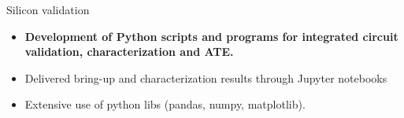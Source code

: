 \begin{cventries}
{\begin{cvitems}
\begin{itemize}
\begin{itemize}
          \end{itemize}
        \end{itemize}
        \item {Silicon validation}
          \begin{itemize}
            \item {\textbf{Development of Python scripts and programs for integrated circuit validation, characterization and ATE.}}
            \item {Delivered bring-up and characterization results through Jupyter notebooks}
            \item {Extensive use of python libs (pandas, numpy, matplotlib).}
          \end{itemize}

\end{cvitems}}
\end{cventries}
